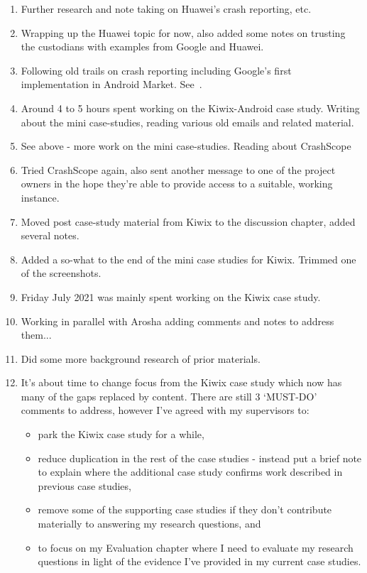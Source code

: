\begin{enumerate}
    \item Further research and note taking on Huawei's crash reporting, etc.
    \item Wrapping up the Huawei topic for now, also added some notes on trusting the custodians with examples from Google and Huawei.
    \item Following old trails on crash reporting including Google's first implementation in Android Market. See~\href{{chapter-crash-recording-and-reporting-in-android}}{}.
    \item Around 4 to 5 hours spent working on the Kiwix-Android case study. Writing about the mini case-studies, reading various old emails and related material.
    \item See above - more work on the mini case-studies. Reading about CrashScope
    \item Tried CrashScope again, also sent another message to one of the project owners in the hope they're able to provide access to a suitable, working instance.
    \item Moved post case-study material from Kiwix to the discussion chapter, added several notes.
    \item Added a so-what to the end of the mini case studies for Kiwix. Trimmed one of the screenshots.
    \item Friday  July 2021 was mainly spent working on the Kiwix case study.
    \item Working in parallel with Arosha adding comments and notes to address them...
    \item Did some more background research of prior materials.
    \item It's about time to change focus from the Kiwix case study which now has many of the gaps replaced by content. There are still 3 `MUST-DO' comments to address, however I've agreed with my supervisors to:
    \begin{itemize}
        \item park the Kiwix case study for a while,
        \item reduce duplication in the rest of the case studies - instead put a brief note to explain where the additional case study confirms work described in previous case studies,
        \item remove some of the supporting case studies if they don't contribute materially to answering my research questions, and
        \item to focus on my Evaluation chapter where I need to evaluate my research questions in light of the evidence I've provided in my current case studies.

\end{itemize}
\end{enumerate}
